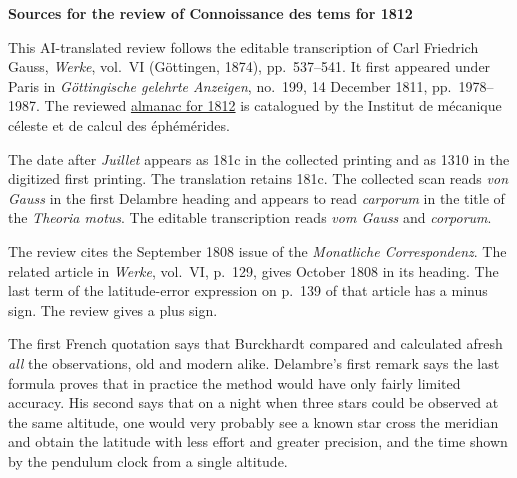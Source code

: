 \clearpage\thispagestyle{empty}
\begin{center}\textbf{Sources for the review of Connoissance des tems for 1812}\end{center}
\noindent This AI-translated review follows the editable transcription of Carl Friedrich Gauss, \textit{Werke}, vol.~VI (Göttingen, 1874), pp.~537--541. It first appeared under Paris in \textit{Göttingische gelehrte Anzeigen}, no.~199, 14 December 1811, pp.~1978--1987. The reviewed \href{https://cdt.imcce.fr/items/show/161}{almanac for 1812} is catalogued by the Institut de mécanique céleste et de calcul des éphémérides.
\par\smallskip\noindent The date after \textit{Juillet} appears as 181c in the collected printing and as 1310 in the digitized first printing. The translation retains 181c. The collected scan reads \textit{von Gauss} in the first Delambre heading and appears to read \textit{carporum} in the title of the \textit{Theoria motus}. The editable transcription reads \textit{vom Gauss} and \textit{corporum}.
\par\smallskip\noindent The review cites the September 1808 issue of the \textit{Monatliche Correspondenz}. The related article in \textit{Werke}, vol.~VI, p.~129, gives October 1808 in its heading. The last term of the latitude-error expression on p.~139 of that article has a minus sign. The review gives a plus sign.
\par\smallskip\noindent The first French quotation says that Burckhardt compared and calculated afresh \emph{all} the observations, old and modern alike. Delambre's first remark says the last formula proves that in practice the method would have only fairly limited accuracy. His second says that on a night when three stars could be observed at the same altitude, one would very probably see a known star cross the meridian and obtain the latitude with less effort and greater precision, and the time shown by the pendulum clock from a single altitude.
